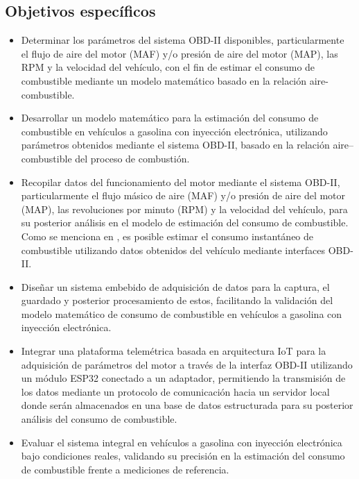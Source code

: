 \subsection{Objetivos específicos}
\begin{itemize}
	\item Determinar los parámetros del sistema OBD-II disponibles, particularmente el flujo de aire del motor (MAF) y/o presión de aire del motor (MAP), las RPM y la velocidad del vehículo, con el fin de estimar el consumo de combustible mediante un modelo matemático basado en la relación aire-combustible.
	
	\item Desarrollar un modelo matemático para la estimación del consumo de combustible en vehículos a gasolina con inyección electrónica, utilizando parámetros obtenidos mediante el sistema OBD-II, basado en la relación aire--combustible del proceso de combustión.
	
	\item Recopilar datos del funcionamiento del motor mediante el sistema OBD-II, particularmente el flujo másico de aire (MAF) y/o presión de aire del motor (MAP), las revoluciones por minuto (RPM) y la velocidad del vehículo, para su posterior análisis en el modelo de estimación del consumo de combustible. Como se menciona en \citep{shaw2019fuel}, es posible estimar el consumo instantáneo de combustible utilizando datos obtenidos del vehículo mediante interfaces OBD-II.
	
	\item Diseñar un sistema embebido de adquisición de datos para la captura, el guardado y posterior procesamiento de estos, facilitando la validación del modelo matemático de consumo de combustible en vehículos a gasolina con inyección electrónica.
	
	\item Integrar una plataforma telemétrica basada en arquitectura IoT para la adquisición de parámetros del motor a través de la interfaz OBD-II utilizando un módulo ESP32 conectado a un adaptador, permitiendo la transmisión de los datos mediante un protocolo de comunicación hacia un servidor local donde serán almacenados en una base de datos estructurada para su posterior análisis del consumo de combustible.
	
	\item Evaluar el sistema integral en vehículos a gasolina con inyección electrónica bajo condiciones reales, validando su precisión en la estimación del consumo de combustible frente a mediciones de referencia.
	
\end{itemize}


